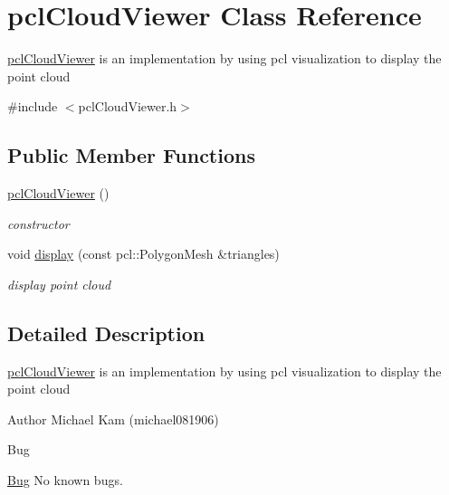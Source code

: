 \hypertarget{classpclCloudViewer}{}\section{pcl\+Cloud\+Viewer Class Reference}
\label{classpclCloudViewer}


\hyperlink{classpclCloudViewer}{pcl\+Cloud\+Viewer} is an implementation by using pcl visualization to display the point cloud
\begin{DoxyItemize}
\item 
\end{DoxyItemize} 




{\ttfamily \#include $<$pcl\+Cloud\+Viewer.\+h$>$}

\subsection*{Public Member Functions}
\begin{DoxyCompactItemize}
\item 
\hyperlink{classpclCloudViewer_a42c5df5bd52456d9c0b9991f6518de25}{pcl\+Cloud\+Viewer} ()\hypertarget{classpclCloudViewer_a42c5df5bd52456d9c0b9991f6518de25}{}\label{classpclCloudViewer_a42c5df5bd52456d9c0b9991f6518de25}

\begin{DoxyCompactList}\small\item\em constructor \end{DoxyCompactList}\item 
void \hyperlink{classpclCloudViewer_ac2d8694c2f060c9e2ec142e459d20114}{display} (const pcl\+::\+Polygon\+Mesh \&triangles)
\begin{DoxyCompactList}\small\item\em display point cloud \end{DoxyCompactList}\end{DoxyCompactItemize}


\subsection{Detailed Description}
\hyperlink{classpclCloudViewer}{pcl\+Cloud\+Viewer} is an implementation by using pcl visualization to display the point cloud
\begin{DoxyItemize}
\item 
\end{DoxyItemize}

\begin{DoxyAuthor}{Author}
Michael Kam (michael081906) 
\end{DoxyAuthor}
\begin{DoxyRefDesc}{Bug}
\item[\hyperlink{bug__bug000004}{Bug}]No known bugs. \end{DoxyRefDesc}


